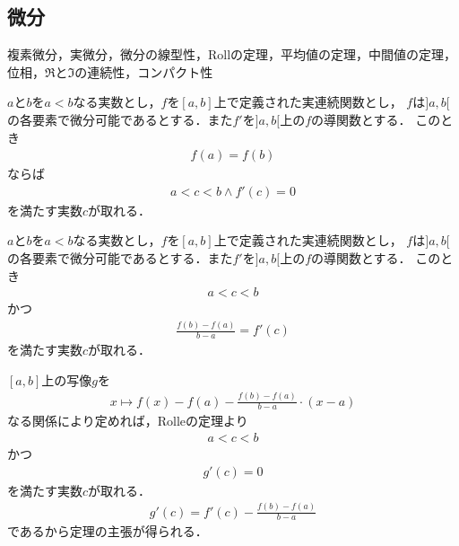 \subsection{微分}
	複素微分，実微分，微分の線型性，Rollの定理，平均値の定理，中間値の定理，
	位相，$\Re$と$\Im$の連続性，コンパクト性
	
	\begin{screen}
		\begin{thm}[Rolleの定理]\label{Rolle_theorem}
			$a$と$b$を$a<b$なる実数とし，$f$を$[a,b]$上で定義された実連続関数とし，
			$f$は$]a,b[$の各要素で微分可能であるとする．また$f'$を$]a,b[$上の$f$の導関数とする．
			このとき
			\begin{align}
				f(a) = f(b)
			\end{align}
			ならば
			\begin{align}
				a < c < b \wedge f'(c) = 0
			\end{align}
			を満たす実数$c$が取れる．
		\end{thm}
	\end{screen}
	
	\begin{screen}
		\begin{thm}[平均値の定理]
		\label{mean_value_theorem_for_real_valued_differentiable_functions}
			$a$と$b$を$a<b$なる実数とし，$f$を$[a,b]$上で定義された実連続関数とし，
			$f$は$]a,b[$の各要素で微分可能であるとする．また$f'$を$]a,b[$上の$f$の導関数とする．
			このとき
			\begin{align}
				a < c < b
			\end{align}
			かつ
			\begin{align}
				\frac{f(b) - f(a)}{b - a} = f'(c)
			\end{align}
			を満たす実数$c$が取れる．
		\end{thm}
	\end{screen}
	
	\begin{sketch}
		$[a,b]$上の写像$g$を
		\begin{align}
			x \longmapsto f(x) - f(a) - \frac{f(b) - f(a)}{b - a} \cdot (x - a)
		\end{align}
		なる関係により定めれば，Rolleの定理より
		\begin{align}
			a < c < b
		\end{align}
		かつ
		\begin{align}
			g'(c) = 0
		\end{align}
		を満たす実数$c$が取れる．
		\begin{align}
			g'(c) = f'(c) - \frac{f(b) - f(a)}{b - a}
		\end{align}
		であるから定理の主張が得られる．
		\QED
	\end{sketch}